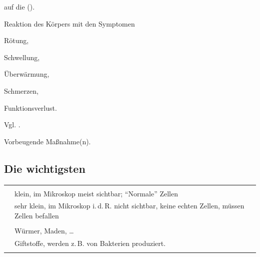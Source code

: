 \begin{description}
  auf die  ().
  \item[\T{Entzündung}] Reaktion des Körpers mit den Symptomen
  \begin{inparaenum}
    \item Rötung,
    \item Schwellung,
    \item Überwärmung,
    \item Schmerzen,
    \item Funktionsverlust.
  \end{inparaenum} Vgl.  .
  \item[\T{Prophylaxe}] 
  Vorbeugende Maßnahme(n).
\end{description}






\subsection{Die wichtigsten }
\label{topic:infektion-erreger}

{}%
{}%
{}%
{}%
{%
\begin{tabulary}{\linewidth}{LL}\addlinespace\toprule\addlinespace
\noindent{}
&
\noindent{}
\\\addlinespace\midrule\addlinespace
\noindent{}
&
klein, im Mikroskop meist sichtbar;
        {\textquotedblleft}Normale{\textquotedblright} Zellen
\\\addlinespace
\noindent{}
&
sehr klein, im Mikroskop i.\,d.\,R. nicht
        sichtbar, keine echten Zellen, müssen Zellen befallen
\\\addlinespace
\noindent{}
&

\\\addlinespace
\noindent{}
&
Würmer, Maden, \ldots
\\\addlinespace
\noindent{}
&
Giftstoffe, werden z.\,B. von Bakterien produziert.
\\\addlinespace\bottomrule
\end{tabulary}
}%


